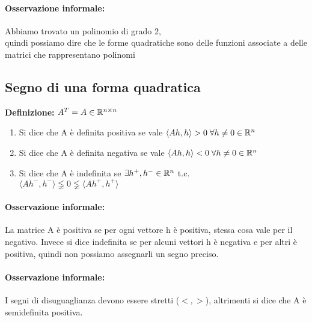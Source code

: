 \documentclass[12pt]{article}
\begin{document}
\paragraph*{Osservazione informale:}
Abbiamo trovato un polinomio di grado 2,\\
quindi possiamo dire che le forme quadratiche sono delle funzioni
associate a delle matrici che rappresentano polinomi


\subsection{Segno di una forma quadratica}

\textbf{Definizione:} $A^T = A \in \mathbb{R}^{n\times n}$

\begin{enumerate}
    \item Si dice che A è definita positiva se vale $\langle Ah, h\rangle > 0\; \forall h \neq 0 \in \mathbb{R} ^n$
    \item Si dice che A è definita negativa se vale $\langle Ah, h\rangle < 0\; \forall h \neq 0 \in \mathbb{R} ^n$
    \item Si dice che A è indefinita se $\exists h^+, h^- \in \mathbb{R} ^n$ t.c. \\$\langle Ah^-,h^-\rangle  \lneqq 0 \lneqq \langle Ah^+,h^+ \rangle$
\end{enumerate}

\paragraph*{Osservazione informale:}
La matrice A è positiva se per ogni vettore h è positiva, stessa cosa vale per il negativo.
Invece si dice indefinita se per alcuni vettori h è negativa e per altri è positiva,
quindi non possiamo assegnarli un segno preciso.

\paragraph*{Osservazione informale:}
I segni di disuguaglianza devono essere stretti ($<, >$),
altrimenti si dice che A è semidefinita positiva.\\
\end{document}
